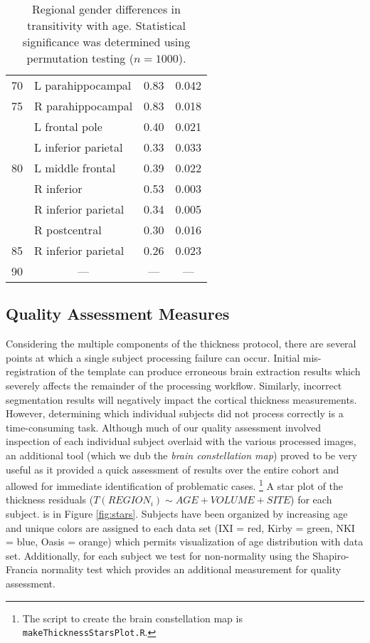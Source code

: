 \begin{table}[htb]
\begin{tabular}{c l c c}
\rowcolor{gray!40}
70 & L parahippocampal & 0.83 & 0.042 \\
\rowcolor{gray!20}
75 & R parahippocampal & 0.83 & 0.018 \\
\rowcolor{gray!20}
{} & L frontal pole & 0.40 & 0.021 \\
\rowcolor{gray!20}
{} & L inferior parietal & 0.33 & 0.033 \\
\rowcolor{gray!40}
80 & L middle frontal & 0.39 & 0.022 \\
\rowcolor{gray!40}
{} & R inferior & 0.53 & 0.003 \\
\rowcolor{gray!40}
{} & R inferior parietal & 0.34 & 0.005 \\
\rowcolor{gray!40}
{} & R postcentral & 0.30 & 0.016 \\
\rowcolor{gray!20}
85 & R inferior parietal & 0.26 & 0.023 \\
\rowcolor{gray!40}
90 & \multicolumn{1}{c}{---} & --- & --- \\
\bottomrule
\end{tabular}
\caption{Regional gender differences in transitivity with age.  Statistical 
significance was determined using permutation testing ($n = 1000$).
}
\label{table:genderDifference}
\end{table}

\subsection{Quality Assessment Measures}
Considering the multiple components of the thickness protocol, there are 
several points at which a single subject processing failure can occur.  Initial mis-registration of the template can produce erroneous brain extraction results
which severely affects the remainder of the processing workflow.  Similarly,
incorrect segmentation results will negatively impact the cortical thickness measurements.
However, determining which individual subjects did not process correctly is a time-consuming task.  Although much of our quality assessment involved inspection of each
individual subject overlaid with the various processed images, an additional tool (which
we dub the {\em brain constellation map}) proved to be very useful as it provided a quick
assessment of results over the entire cohort and allowed for immediate identification
of problematic cases.%
\footnote{
  The script to create the brain constellation map is  {\tt makeThicknessStarsPlot.R}.
}  
A star plot of the thickness residuals 
($T(REGION_i) \sim AGE  + VOLUME+ SITE$) for each subject.
is in Figure \ref{fig:stars}. Subjects have been organized by 
increasing age and unique colors are assigned to each 
data set (IXI = red, Kirby = green, NKI = blue, Oasis = orange)
which permits visualization of age
distribution with data set.  Additionally, for each subject we
test for non-normality using the Shapiro-Francia normality test which
provides an additional measurement for quality assessment.

